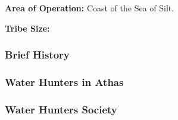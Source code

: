 


\textbf{Area of Operation:} Coast of the Sea of Silt.

\textbf{Tribe Size:} 

\subsubsection{Brief History}


\subsubsection{Water Hunters in Athas}


\subsubsection{Water Hunters Society}







